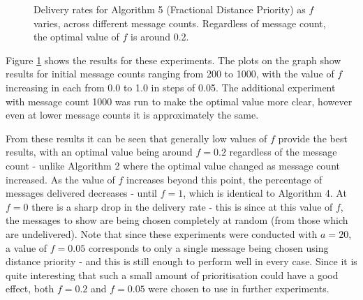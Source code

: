 \documentclass[bsc,frontabs,twoside,singlespacing,parskip,deptreport]{infthesis}     %
\begin{document}
\begin{figure}
\centering
{}
\caption{Delivery rates for Algorithm 5 (Fractional Distance Priority) as $f$ varies, across different message counts. Regardless of message count, the optimal value of $f$ is around 0.2.}
\label{fig:distance_priority_fraction}
\end{figure}

Figure \ref{fig:distance_priority_fraction} shows the results for these experiments. The plots on the graph show results for initial message counts ranging from 200 to 1000, with the value of $f$ increasing in each from 0.0 to 1.0 in steps of 0.05. The additional experiment with message count 1000 was run to make the optimal value more clear, however even at lower message counts it is approximately the same.

From these results it can be seen that generally low values of $f$ provide the best results, with an optimal value being around $f=0.2$ regardless of the message count - unlike Algorithm 2 where the optimal value changed as message count increased. As the value of $f$ increases beyond this point, the percentage of messages delivered decreases - until $f=1$, which is identical to Algorithm 4. At $f=0$ there is a sharp drop in the delivery rate - this is since at this value of $f$, the messages to show are being chosen completely at random (from those which are undelivered). Note that since these experiments were conducted with $a=20$, a value of $f=0.05$ corresponds to only a single message being chosen using distance priority - and this is still enough to perform well in every case. Since it is quite interesting that such a small amount of prioritisation could have a good effect, both $f=0.2$ and $f=0.05$ were chosen to use in further experiments.
\end{document}
